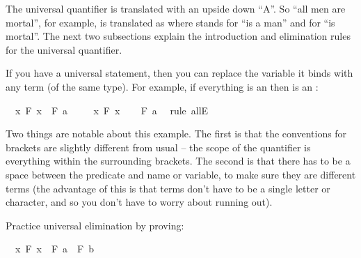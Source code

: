 \begin{isabellebody}
\begin{isamarkuptext}
The universal quantifier is translated with an upside down ``A''. So ``all men are mortal'',
for example, is translated as  where  stands for ``is a man''
and  for ``is mortal''. The next two subsections explain the introduction and elimination
rules for the universal quantifier.%
\end{isamarkuptext}\isamarkuptrue%
%
\isamarkuptrue%
%
\begin{isamarkuptext}%
If you have a universal statement, then you can replace the variable it binds with any term 
(of the same type). For example, if everything is an  then  is an :%
\end{isamarkuptext}\isamarkuptrue%
\isamarkupfalse%
\ {\isachardoublequoteopen}{\isacharparenleft}{\isasymforall}\ x{\isachardot}\ F\ x{\isacharparenright}\ {\isasymlongrightarrow}\ F\ a{\isachardoublequoteclose}\isanewline
%
\isadelimproof
%
\endisadelimproof
%
\isatagproof
{}\isamarkupfalse%
\isanewline
\ \ \isamarkupfalse%
\ {\isachardoublequoteopen}{\isasymforall}\ x{\isachardot}\ F\ x{\isachardoublequoteclose}\isanewline
\ \ \isamarkupfalse%
\ {\isachardoublequoteopen}F\ a{\isachardoublequoteclose}\ \isamarkupfalse%
\ {\isacharparenleft}rule\ allE{\isacharparenright}\isanewline
{}\isamarkupfalse%
%
\endisatagproof
{\isafoldproof}%
%
\isadelimproof
%
\endisadelimproof
%
\begin{isamarkuptext}%
Two things are notable about this example. The first is that the conventions for brackets are 
slightly different from usual -- the scope of the quantifier is everything within the surrounding 
brackets. The second is that there has to be a space between the predicate and name or variable,
to make sure they are different terms (the advantage of this is that terms don't have to be a single
letter or character, and so you don't have to worry about running out).%
\end{isamarkuptext}\isamarkuptrue%
%
\begin{isamarkuptext}%
\begin{Exercise} Practice universal elimination by proving: \end{Exercise}%
\end{isamarkuptext}\isamarkuptrue%
\isamarkupfalse%
\ {\isachardoublequoteopen}{\isacharparenleft}{\isasymforall}\ x{\isachardot}\ F\ x{\isacharparenright}\ {\isasymlongrightarrow}\ F\ a\ {\isasymand}\ F\ b{\isachardoublequoteclose}%

\end{isabellebody}
